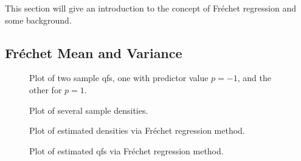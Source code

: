 This section will give an introduction to the concept of Fréchet regression
and some background.

\subsection{Fréchet Mean and Variance}
\label{sec:fr mean and variance}

\begin{figure}[h]
    \centering
    \resizebox{1\textwidth}{!}{}
    \caption[Two sample qfs]{Plot of two sample qfs, one with predictor value $p = -1$, and the other
    for $p = 1$.}
    \label{fig:1stlastqf}
\end{figure}

\begin{figure}[h]
    \centering
    \resizebox{1\textwidth}{!}{}
    \caption[Several sampled densities]{Plot of several sample densities.}
    \label{fig:some_densities}
\end{figure}

\begin{figure}[h]
    \centering
    \resizebox{1\textwidth}{!}{}
    \caption[Estimated pdfs from Fréchet method]{Plot of estimated densities via Fréchet regression method.}
    \label{fig:frechet_estimates}
\end{figure}

\begin{figure}[h]
    \centering
    \resizebox{1\textwidth}{!}{}
    \caption[Estimated qfs from Fréchet method]{Plot of estimated qfs via Fréchet regression method.}
    \label{fig:frechet_estimates_3d}
\end{figure}


